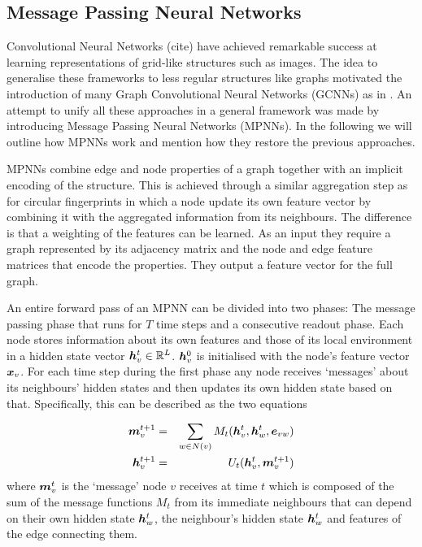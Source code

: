 \subsection{Message Passing Neural Networks}
\label{sec:MPNN}

Convolutional Neural Networks (cite) have achieved remarkable success at learning representations of grid-like structures such as images. The idea to generalise these frameworks to less regular structures like graphs motivated the introduction of many Graph Convolutional Neural Networks (GCNNs) as in \citep{li2015gated,duvenaud2015convolutional,Kearnes_2016, Sch_tt_2017}. An attempt to unify all these approaches in a general framework was made by \cite{GilmerSRVD17} introducing Message Passing Neural Networks (MPNNs). In the following we will outline how MPNNs work and mention how they restore the previous approaches. 

MPNNs combine edge and node properties of a graph together with an implicit encoding of the structure. This is achieved through a similar aggregation step as for circular fingerprints in which a node update its own feature vector by combining it with the aggregated information from its neighbours. The difference is that a weighting of the features can be learned. As an input they require a graph represented by its adjacency matrix and the node and edge feature matrices that encode the properties. They output a feature vector for the full graph. 

An entire forward pass of an MPNN can be divided into two phases: The message passing phase that runs for $T$ time steps and a consecutive readout phase. Each node stores information about its own features and those of its local environment in a hidden state vector ${\boldsymbol h}_v^t \in {\mathbb{R}}^L$.  $\boldsymbol h_v^0$ is initialised with the node's feature vector $\boldsymbol x_v$. For each time step during the first phase any node receives `messages' about its neighbours' hidden states and then updates its own hidden state based on that. Specifically, this can be described as the two equations

\begin{eqnarray}
\boldsymbol m_v^{t+1} & =& \sum_{w\in N(v)} M_t(\boldsymbol h_v^t, \boldsymbol h_w^t, \boldsymbol e_{vw}) \label{eq:message_passing} \\
\boldsymbol h_v^{t+1} & =& U_t(\boldsymbol h_v^t, \boldsymbol m_v^{t+1})\label{eq:updating}
\end{eqnarray}
where $\boldsymbol m_v^t$ is the `message' node $v$ receives at time $t$ which is composed of the sum of the message functions $M_t$ from its immediate neighbours that can depend on their own hidden state $\boldsymbol h_w^t$, the neighbour's hidden state $\boldsymbol h_w^t$ and features of the edge connecting them.

